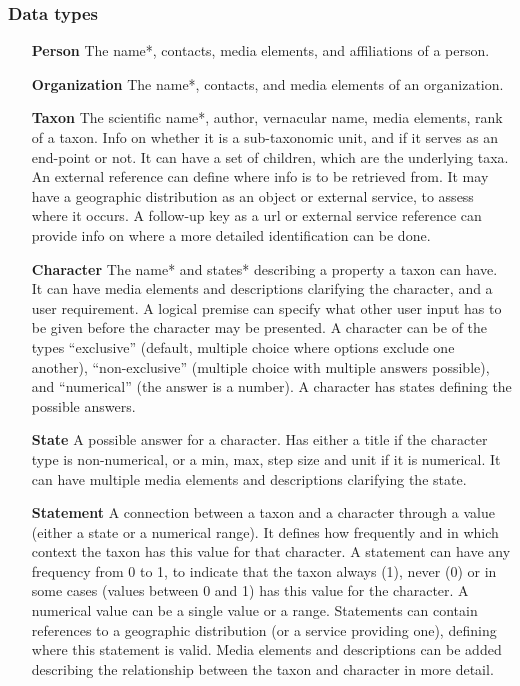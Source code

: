 \documentclass[10pt,letterpaper]{article}
\begin{document}
\subsubsection*{
Data types
}
\begin{itemize}
\item[\textbf{Person}]
The name*, contacts, media elements, and affiliations of a person.
\item[\textbf{Organization}]
The name*, contacts, and media elements of an organization.
\item[\textbf{Taxon}]
The scientific name*, author, vernacular name, media elements, rank of a taxon. Info on whether it is a sub-taxonomic unit, and if it serves as an end-point or not. It can have a set of children, which are the underlying taxa. An external reference can define where info is to be retrieved from. It may have a geographic distribution as an object or external service, to assess where it occurs. A follow-up key as a url or external service reference can provide info on where a more detailed identification can be done.
\item[\textbf{Character}]
The name* and states* describing a property a taxon can have. It can have media elements and descriptions clarifying the character, and a user requirement. A logical premise can specify what other user input has to be given before the character may be presented. A character can be of the types ``exclusive'' (default, multiple choice where options exclude one another), ``non-exclusive'' (multiple choice with multiple answers possible), and ``numerical'' (the answer is a number). A character has states defining the possible answers.
\item[\textbf{State}]
A possible answer for a character. Has either a title if the character type is non-numerical, or a min, max, step size and unit if it is numerical. It can have multiple media elements and descriptions clarifying the state. 
\item[\textbf{Statement}]
A connection between a taxon and a character through a value (either a state or a numerical range). It defines how frequently and in which context the taxon has this value for that character. A statement can have any frequency from 0 to 1, to indicate that the taxon always (1), never (0) or in some cases (values between 0 and 1) has this value for the character. A numerical value can be a single value or a range. Statements can contain references to a geographic distribution (or a service providing one), defining where this statement is valid. Media elements and descriptions can be added describing the relationship between the taxon and character in more detail.

\end{itemize}
\end{document}
